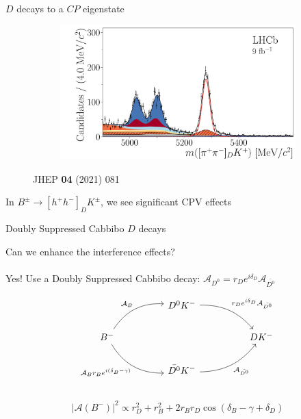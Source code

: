 \documentclass{beamer}
\begin{document}
\begin{frame}{$D$ decays to a $C\!P$ eigenstate}
\begin{figure}
\begin{subfigure}{0.45\textwidth}
    \end{subfigure}%
    \begin{subfigure}{0.45\textwidth}
      \includegraphics[width = 1.0\textwidth]{Plots/B2DK_D2pipi_Plus.pdf}
    \end{subfigure}
    \caption*{\tiny JHEP \textbf{04} (2021) 081}
  \end{figure}
  \vspace{-0.5cm}
  \begin{center}
    \Large In $B^\pm\to[h^+h^-]_DK^\pm$, we see significant CPV effects
  \end{center}
\end{frame}

\begin{frame}[fragile]{Doubly Suppressed Cabbibo $D$ decays}
  \begin{center}
    Can we enhance the interference effects?\\~\\
    Yes! Use a Doubly Suppressed Cabbibo decay: $\mathcal{A}_{D^0} = r_De^{i\delta_D}\mathcal{A}_{\bar{D^0}}$
  \end{center}
  \begin{equation*}
    \begin{tikzcd}[column sep=huge]
      & D^0K^- \arrow[dr, bend left = 25, "r_De^{i\delta_D}\mathcal{A}_{\bar{D^0}}"] & \\
      B^- \arrow[ur, bend left, "\mathcal{A}_B"] \arrow[dr, bend right, "\mathcal{A}_B r_B e^{i(\delta_B - \gamma)}"'] & [5cm] & DK^- \\
      & \bar{D^0}K^- \arrow[ur, bend right = 25, "\mathcal{A}_{\bar{D^0}}"'] & \\
    \end{tikzcd}
  \end{equation*}
  \begin{equation*}
    \lvert\mathcal{A}(B^-)\lvert^2\propto r_D^2 + r_B^2 + 2r_Br_D\cos(\delta_B - \gamma + \delta_D)
  \end{equation*}
\end{frame}
\end{document}
